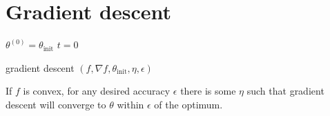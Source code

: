 \section{Gradient descent}
\begin{algorithm}[H]
    \DontPrintSemicolon
    $\theta^{(0)} = \theta_{\mathrm{init}} $\;
    $t = 0 $\;
    

    \Return{$\theta $}
    \caption{ gradient descent $(f, \nabla f, \theta_{\mathrm{init}} , \eta , \epsilon )$}
\end{algorithm}

\begin{theorem}
    If \(f\) is convex, for any desired accuracy \(\epsilon\) there is some \(\eta\) such that gradient descent will converge to \(\theta\) within \(\epsilon\) of the optimum.
\end{theorem}
